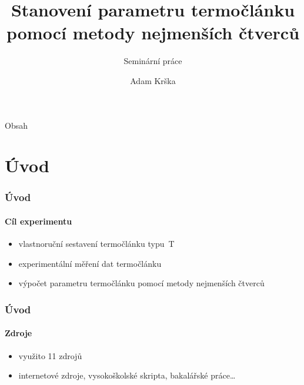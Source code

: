 \documentclass[smaller,aspectratio=1610,handout]{beamer}
\author[A. Krška]{Adam Krška}
\title[Stanovení parametru termočlánku]{Stanovení parametru termočlánku pomocí
metody nejmenších čtverců}
\subtitle{Seminární práce}
\institute[GSS Mikulov]{Gymnázium a střední odborná škola Mikulov}
\date{}
\begin{document}
\frame[plain]{\titlepage}

\begin{frame}{Obsah}
	\tableofcontents
\end{frame}

\section{Úvod}
\begin{frame}
	\frametitle{Úvod}
	\framesubtitle{Cíl experimentu}
	\begin{itemize}
		\item vlastnoruční sestavení termočlánku typu~T
		\item experimentální měření dat termočlánku
		\item výpočet parametru termočlánku pomocí metody nejmenších čtverců
	\end{itemize}	
\end{frame}


\begin{frame}
	\frametitle{Úvod}
	\framesubtitle{Zdroje}
	\begin{itemize}
		\item využito 11 zdrojů
		\item internetové zdroje, vysokoškolské skripta, bakalářské práce\dots
	\end{itemize}
\end{frame}
\end{document}
